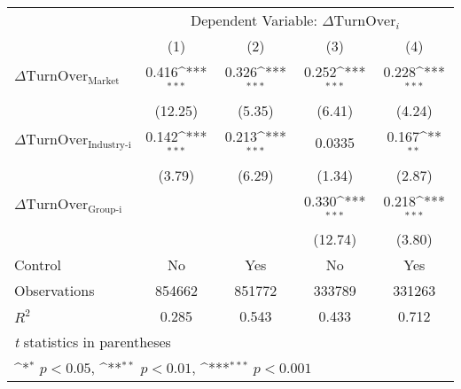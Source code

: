 {
\def\sym#1{\ifmmode^{#1}\else\(^{#1}\)\fi}
\begin{tabular}{l*{4}{c}}
\hline\hline
                    &\multicolumn{4}{c}{Dependent Variable: $\Delta \text{TurnOver}_{i} $ }                 \\\cmidrule(lr){2-5}
                    &\multicolumn{1}{c}{(1)}         &\multicolumn{1}{c}{(2)}         &\multicolumn{1}{c}{(3)}         &\multicolumn{1}{c}{(4)}         \\
\hline
 $ \Delta \text{TurnOver}_{\text{Market}} $ &       0.416\sym{***}&       0.326\sym{***}&       0.252\sym{***}&       0.228\sym{***}\\
                    &     (12.25)         &      (5.35)         &      (6.41)         &      (4.24)         \\
[1em]
 $ \Delta \text{TurnOver}_{\text{Industry-i}} $ &       0.142\sym{***}&       0.213\sym{***}&      0.0335         &       0.167\sym{**} \\
                    &      (3.79)         &      (6.29)         &      (1.34)         &      (2.87)         \\
[1em]
 $ \Delta \text{TurnOver}_{\text{Group-i}} $ &                     &                     &       0.330\sym{***}&       0.218\sym{***}\\
                    &                     &                     &     (12.74)         &      (3.80)         \\
\hline
Control             &          No         &         Yes         &          No         &         Yes         \\
Observations        &      854662         &      851772         &      333789         &      331263         \\
$ R^2 $             &       0.285         &       0.543         &       0.433         &       0.712         \\
\hline\hline
\multicolumn{5}{l}{\footnotesize \textit{t} statistics in parentheses}\\
\multicolumn{5}{l}{\footnotesize \sym{*} \(p<0.05\), \sym{**} \(p<0.01\), \sym{***} \(p<0.001\)}\\
\end{tabular}
}
